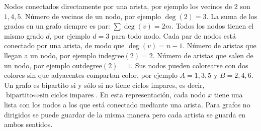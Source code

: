 {}\markdownRendererHardLineBreak
{}Nodos conectados directamente por una arista, por ejemplo los vecinos de $2$ son ${1,4,5}$.\markdownRendererParagraphSeparator
{}\markdownRendererHardLineBreak
{}Número de vecinos de un nodo, por ejemplo $\deg(2) = 3$.\markdownRendererParagraphSeparator
{}\markdownRendererHardLineBreak
{}La suma de los grados en un grafo siempre es par: $\sum \deg(v) = 2m$.\markdownRendererParagraphSeparator
{}\markdownRendererHardLineBreak
{}Todos los nodos tienen el mismo grado $d$, por ejemplo $d = 3$ para todo nodo.\markdownRendererParagraphSeparator
{}\markdownRendererHardLineBreak
{}Cada par de nodos está conectado por una arista, de modo que $\deg(v) = n - 1$.\markdownRendererParagraphSeparator
{}\markdownRendererHardLineBreak
{}Número de aristas que llegan a un nodo, por ejemplo $\text{indegree}(2) = 2$.\markdownRendererParagraphSeparator
{}\markdownRendererHardLineBreak
{}Número de aristas que salen de un nodo, por ejemplo $\text{outdegree}(2) = 1$.\markdownRendererParagraphSeparator
{}\markdownRendererHardLineBreak
{}Sus nodos pueden colorearse con dos colores sin que adyacentes compartan color, por ejemplo $A = {1,3,5}$ y $B = {2,4,6}$.\markdownRendererParagraphSeparator
{}\markdownRendererHardLineBreak
{}Un grafo es bipartito si y sólo si no tiene ciclos impares, es decir, $\text{bipartito} \Leftrightarrow \text{sin ciclos impares}$.\markdownRendererParagraphSeparator
{}
\markdownRendererSectionEnd \markdownRendererSectionBegin
{}\markdownRendererInterblockSeparator
{}\markdownRendererSectionBegin
{}\markdownRendererInterblockSeparator
{}\markdownRendererSectionBegin
{}\markdownRendererInterblockSeparator
{}En esta representación, cada nodo $x$ tiene una lista con los nodos a los que está conectado mediante una arista. Para grafos no dirigidos se puede guardar de la misma manera pero cada artista se guarda en ambos sentidos.\markdownRendererInterblockSeparator
{}\markdownRendererInterblockSeparator

